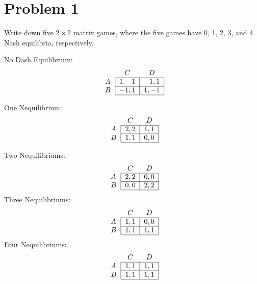 \documentclass[11pt]{article}
\begin{document}
	
	
	\psetheader
\section*{Problem 1}
\begin{problem}
    Write down five $2\times 2$ matrix games, where the five games have 0, 1, 2, 3, and 4 Nash
equilibria, respectively.
\end{problem}

\begin{solution}
   No Dash Equilibrium:
    \[
\begin{tabular}{lcc}
& $C$ & $D$ \\
\cline{2-3}
$A$ & \multicolumn{1}{|c}{$1,-1$} & \multicolumn{1}{|c|}{$-1,1$} \\
\cline{2-3}
$B$ & \multicolumn{1}{|c}{$-1,1$} & \multicolumn{1}{|c|}{$1,-1$} \\
\cline{2-3}
\end{tabular}
\]

One Nequilibrium:
\[
\begin{tabular}{lcc}
& $C$ & $D$ \\
\cline{2-3}
$A$ & \multicolumn{1}{|c}{$2,2$} & \multicolumn{1}{|c|}{$1,1$} \\
\cline{2-3}
$B$ & \multicolumn{1}{|c}{$1,1$} & \multicolumn{1}{|c|}{$0,0$} \\
\cline{2-3}
\end{tabular}
\]

Two Nequilibriums:
\[
\begin{tabular}{lcc}
& $C$ & $D$ \\
\cline{2-3}
$A$ & \multicolumn{1}{|c}{$2,2$} & \multicolumn{1}{|c|}{$0,0$} \\
\cline{2-3}
$B$ & \multicolumn{1}{|c}{$0,0$} & \multicolumn{1}{|c|}{$2,2$} \\
\cline{2-3}
\end{tabular}
\]
Three Nequilibriums:
\[
\begin{tabular}{lcc}
& $C$ & $D$ \\
\cline{2-3}
$A$ & \multicolumn{1}{|c}{$1,1$} & \multicolumn{1}{|c|}{$0,0$} \\
\cline{2-3}
$B$ & \multicolumn{1}{|c}{$1,1$} & \multicolumn{1}{|c|}{$1,1$} \\
\cline{2-3}
\end{tabular}
\]
Four Nequilibriums:
\[
\begin{tabular}{lcc}
& $C$ & $D$ \\
\cline{2-3}
$A$ & \multicolumn{1}{|c}{$1,1$} & \multicolumn{1}{|c|}{$1,1$} \\
\cline{2-3}
$B$ & \multicolumn{1}{|c}{$1,1$} & \multicolumn{1}{|c|}{$1,1$} \\
\cline{2-3}
\end{tabular}
\]
\end{solution}
\newpage
\end{document}
